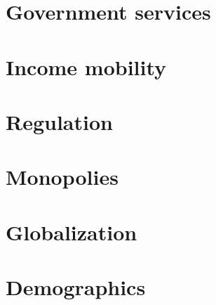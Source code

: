 \documentclass[a4paper,11pt,oneside,headsepline]{scrartcl}
\newcommand{\Qq}[1]{#1}
\newcommand{\QO}{$\Box$}%
\newcounter{qr}
\newcommand{\Qrating}[1]{\QO\forloop{qr}{1}{\value{qr} < #1}{---\QO}}
\newlength{\qt}
\newcommand{\Qtab}[2]{
\setlength{\qt}{\linewidth}
\addtolength{\qt}{-#1}
\hfill\parbox[t]{\qt}{\raggedright #2}
}
\newcounter{itemnummer}
\newcommand{\Qitem}[2][]{%
\ifthenelse{\equal{#1}{}}{\stepcounter{itemnummer}}{}
\ifthenelse{\equal{#1}{a}}{\stepcounter{itemnummer}}{}
\begin{enumerate}[topsep=2pt,leftmargin=2.8em]
\item[\arabic{itemnummer}#1.] #2
\end{enumerate}
}
\begin{document}


    

\section*{Government services}

    

\section*{Income mobility}

\section*{Regulation}


\section*{Monopolies}

\section*{Globalization}

\section*{Demographics}
\end{document}
